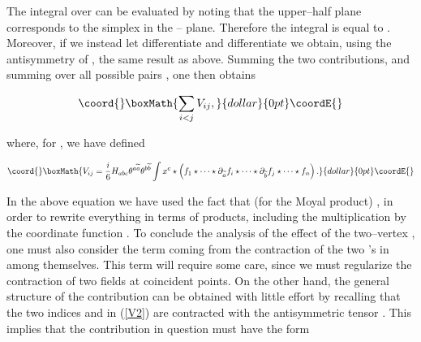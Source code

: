 \documentclass[a4paper,11pt]{article}
\providecommand{\mathbb}[1]{{\bf{#1}}}
\begin{document}
\noindent
The integral over \myHighlight{$\Sigma $}\coordHE{} can be evaluated by noting that the upper--half
plane \myHighlight{$\mathbb{H}^{+}$}\coordHE{} corresponds to the simplex \coordHE{} in the 
\coordHE{}--\coordHE{} plane. Therefore the integral 
\coordHE{} is equal to 
\coordHE{}. Moreover, if we instead let \coordHE{} differentiate 
\coordHE{} and \coordHE{} differentiate \coordHE{} we obtain, using the 
antisymmetry of \coordHE{}, the same result as above. Summing the two 
contributions, and summing over all possible pairs \coordHE{}, one then 
obtains

$$\coord{}\boxMath{
\sum_{i<j}V_{ij} ,
}{dollar}{0pt}\coordE{}$$

\noindent
where, for \coordHE{}, we have defined 

$$\coord{}\boxMath{
V_{ij}=\frac{i}{6}H_{abc} \theta^{a\widetilde{a}} \theta^{b\widetilde{b}}
\int x^{c}\star \left( f_{1}\star \cdots \star \partial_{\widetilde{a}}
f_{i}\star \cdots \star \partial_{\widetilde{b}} f_{j}\star \cdots \star
f_{n}\right) .
}{dollar}{0pt}\coordE{}$$

\noindent
In the above equation we have used the fact that (for the Moyal product) 
\coordHE{}, in order to rewrite everything in terms 
of \myHighlight{$\star$}\coordHE{} products, including the multiplication by the coordinate function 
\coordHE{}. To conclude the analysis of the effect of the two--vertex 
\coordHE{}, one must also consider the term coming from the contraction of 
the two \myHighlight{$\zeta$}\coordHE{}'s in \coordHE{} among themselves. This term will require 
some care, since we must regularize the contraction of two fields at 
coincident points. On the other hand, the general structure of the contribution 
can be obtained with little effort by recalling that the two indices \coordHE{} and 
\coordHE{} in (\ref{V2}) are contracted with the antisymmetric tensor \coordHE{}. 
This implies that the contribution in question must have the form 
\end{document}
